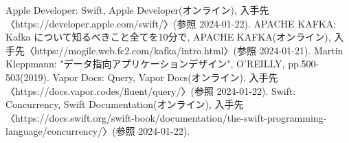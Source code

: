 \documentclass[../../main]{subfiles}
\begin{document}
\begin{thebibliography}{99}
         Apple Developer: Swift, Apple Developer(オンライン), 入手先〈https://developer.apple.com/swift/〉(参照 2024-01-22).
         APACHE KAFKA: Kafka について知るべきこと全てを10分で, APACHE KAFKA(オンライン), 入手先〈https://mogile.web.fc2.com/kafka/intro.html〉(参照 2024-01-21).
         Martin Kleppmann: "データ指向アプリケーションデザイン", O'REILLY, pp.500-503(2019).
         Vapor Docs: Query, Vapor Docs(オンライン), 入手先〈https://docs.vapor.codes/fluent/query/〉(参照 2024-01-22).
         Swift: Concurrency, Swift Documentation(オンライン), 入手先〈https://docs.swift.org/swift-book/documentation/the-swift-programming-language/concurrency/〉(参照 2024-01-22).
    \end{thebibliography}
    \clearpage
\end{document}

